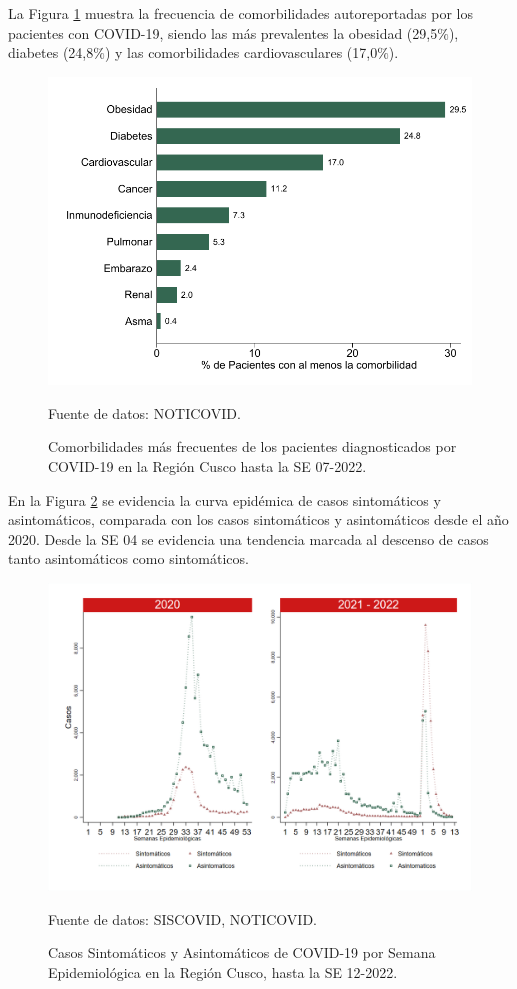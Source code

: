 \documentclass[12pt,a4paper,openany]{book}
\begin{document}
La Figura \ref{fig:comorbilidades} muestra la frecuencia de comorbilidades autoreportadas por los pacientes con COVID-19, siendo las más prevalentes la obesidad (29,5$\%$), diabetes (24,8$\%$) y las comorbilidades cardiovasculares (17,0$\%$).  
\begin{figure}[h]
	\caption{Comorbilidades más frecuentes de los pacientes diagnosticados por COVID-19 en la Región Cusco hasta la SE 07-2022. }\label{fig:comorbilidades}
	\begin{center}
		\includegraphics[width=0.65\linewidth]{../figuras/figura_comorbilidad.pdf}
	\end{center}
	{\footnotesize {Fuente de datos: NOTICOVID.}}
\end{figure}
\clearpage
 En la Figura \ref{fig:sintomaticos_asintomati} se evidencia la curva epidémica de casos sintomáticos y asintomáticos, comparada con los casos sintomáticos y asintomáticos desde el año 2020. Desde la SE 04 se evidencia una tendencia marcada al descenso de casos tanto asintomáticos como sintomáticos. 
 
\begin{figure}[h]
	\caption{Casos Sintomáticos y Asintomáticos de COVID-19 por Semana Epidemiológica en la Región Cusco, hasta la SE 12-2022.  }\label{fig:sintomaticos_asintomati}
	
	\begin{center}
		\includegraphics[width=0.75\linewidth]{../figuras/sintomaticos_20_21_22.png}
	\end{center}
	{\footnotesize {Fuente de datos: SISCOVID, NOTICOVID.}}
\end{figure}
\clearpage
\end{document}
